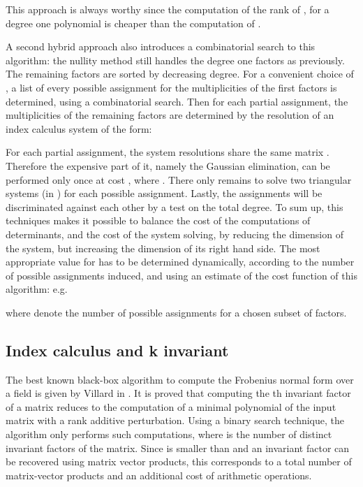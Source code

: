 \documentclass{article}
\begin{document}
This approach is always worthy since the computation of the rank of ,
for a degree one polynomial  is cheaper than the computation of
 \cite{jgd:2002:villard}.




A second hybrid approach also introduces a combinatorial search to this
algorithm: the nullity method still handles the  degree one factors as
previously. 
The remaining factors  are sorted by decreasing degree. For a
convenient choice of , a list of every possible assignment for the
multiplicities of the first  factors is determined, using a combinatorial search.
Then for each partial assignment, the multiplicities of the remaining factors
are determined by the resolution of an index calculus system of the form:
{\small 
}


For each partial assignment, the system resolutions share the same matrix
. Therefore the expensive part of it, namely the Gaussian elimination, can be
performed only once  at cost , where .
There only remains to solve two triangular systems (in )
for each possible assignment. 
Lastly, the assignments will be discriminated against each other by a test on
the total degree. 
To sum up, this techniques makes it possible to balance the cost of the
computations of determinants, and the cost of the system solving, by
reducing the dimension of the system, but increasing the dimension of its right
hand side.
The most appropriate value for  has to be determined dynamically, according
to the number of possible assignments induced, and using an estimate of the cost
function of this algorithm: e.g.

where  denote the number of possible assignments for a chosen subset of
 factors.











\subsection{Index calculus and k invariant}

The best known black-box algorithm to compute the Frobenius normal form over a
field is given by Villard in \cite{Villard:2000:Frob}. It is proved that computing the
th invariant factor of a matrix reduces to the computation of a minimal
polynomial of the input matrix with a rank  additive perturbation.
Using a binary search technique, the algorithm only performs 
such computations, where  is the number of distinct invariant factors of the matrix.
Since  is smaller than  and  an invariant factor can
be recovered using  matrix vector products, this corresponds
to a total number of  matrix-vector products and an
additional cost of  arithmetic
operations.
\end{document}
